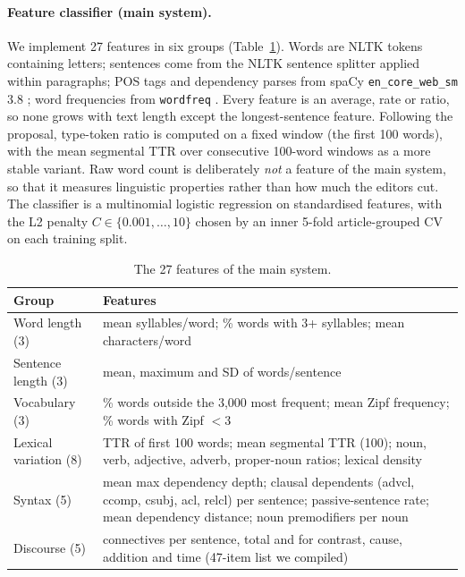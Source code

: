 \paragraph{Feature classifier (main system).}
We implement 27 features in six groups (Table~\ref{tab:features}). Words are NLTK tokens containing letters; sentences come from the NLTK sentence splitter applied within paragraphs; POS tags and dependency parses from spaCy \texttt{en\_core\_web\_sm} 3.8 \citep{honnibal2020spacy}; word frequencies from \texttt{wordfreq} \citep{speer2022wordfreq}. Every feature is an average, rate or ratio, so none grows with text length except the longest-sentence feature. Following the proposal, type-token ratio is computed on a fixed window (the first 100 words), with the mean segmental TTR over consecutive 100-word windows as a more stable variant. Raw word count is deliberately \emph{not} a feature of the main system, so that it measures linguistic properties rather than how much the editors cut. The classifier is a multinomial logistic regression on standardised features, with the L2 penalty $C \in \{0.001, \dots, 10\}$ chosen by an inner 5-fold article-grouped CV on each training split.

\begin{table}[t]
\centering\footnotesize
\setlength{\tabcolsep}{3pt}
\begin{tabular}{@{}l>{\raggedright\arraybackslash}p{4.55cm}@{}}
\toprule
Group & Features \\
\midrule
Word length (3) & mean syllables/word; \% words with 3+ syllables; mean characters/word \\
Sentence length (3) & mean, maximum and SD of words/sentence \\
Vocabulary (3) & \% words outside the 3,000 most frequent; mean Zipf frequency; \% words with Zipf $<3$ \\
Lexical variation (8) & TTR of first 100 words; mean segmental TTR (100); noun, verb, adjective, adverb, proper-noun ratios; lexical density \\
Syntax (5) & mean max dependency depth; clausal dependents (advcl, ccomp, csubj, acl, relcl) per sentence; passive-sentence rate; mean dependency distance; noun premodifiers per noun \\
Discourse (5) & connectives per sentence, total and for contrast, cause, addition and time (47-item list we compiled) \\
\bottomrule
\end{tabular}
\caption{The 27 features of the main system.}
\label{tab:features}
\end{table}

